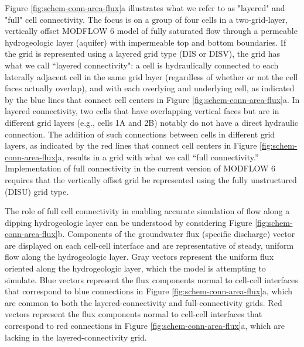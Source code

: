 \documentclass{article}
\begin{document}
Figure \ref{fig:schem-conn-area-flux}a illustrates what we refer to as "layered" and "full" cell connectivity. The focus is on a group of four cells in a two-grid-layer, vertically offset MODFLOW 6 model of fully saturated flow through a permeable hydrogeologic layer (aquifer) with impermeable top and bottom boundaries. If the grid is represented using a layered grid type (DIS or DISV), the grid has what we call ``layered connectivity": a cell is hydraulically connected to each laterally adjacent cell in the same grid layer (regardless of whether or not the cell faces actually overlap), and with each overlying and underlying cell, as indicated by the blue lines that connect cell centers in Figure \ref{fig:schem-conn-area-flux}a. In layered connectivity, two cells that have overlapping vertical faces but are in different grid layers (e.g., cells 1A and 2B) notably do not have a direct hydraulic connection. The addition of such connections between cells in different grid layers, as indicated by the red lines that connect cell centers in Figure \ref{fig:schem-conn-area-flux}a, results in a grid with what we call ``full connectivity.''  Implementation of full connectivity in the current version of MODFLOW 6 \citep{modflow650software} requires that the vertically offset grid be represented using the fully unstructured (DISU) grid type.

The role of full cell connectivity in enabling accurate simulation of flow along a dipping hydrogeologic layer can be understood by considering Figure \ref{fig:schem-conn-area-flux}b. Components of the groundwater flux (specific discharge) vector are displayed on each cell-cell interface and are representative of steady, uniform flow along the hydrogeologic layer. Gray vectors represent the uniform flux oriented along the hydrogeologic layer, which the model is attempting to simulate. Blue vectors represent the flux components normal to cell-cell interfaces that correspond to blue connections in Figure \ref{fig:schem-conn-area-flux}a, which are common to both the layered-connectivity and full-connectivity grids. Red vectors represent the flux components normal to cell-cell interfaces that correspond to red connections in Figure \ref{fig:schem-conn-area-flux}a, which are lacking in the layered-connectivity grid.
\end{document}
